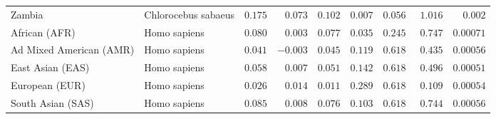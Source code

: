 \begin{center}
\begin{adjustbox}{width = 1\textwidth}
\begin{tabular}{|l|l|r|r|r|r|r|r|r|}
            Zambia        & Chlorocebus sabaeus        & $ 0.175$ & $ 0.073$ & $ 0.102$ & $ 0.007$ & $ 0.056~~$ & $ 1.016$ & $ 0.002$ \\
            African (AFR)               & Homo sapiens        & $ 0.080$ & $ 0.003$ & $ 0.077$ & $ 0.035$ & $ 0.245~~$        & $ 0.747$ & $0.00071$ \\
            Ad Mixed American (AMR)                 & Homo sapiens        & $ 0.041$ & $-0.003$ & $ 0.045$ & $ 0.119$ & $ 0.618~~$        & $ 0.435$ & $0.00056$ \\
            East Asian (EAS)              & Homo sapiens        & $ 0.058$ & $ 0.007$ & $ 0.051$ & $ 0.142$ & $ 0.618~~$        & $ 0.496$ & $0.00051$ \\
            European (EUR)              & Homo sapiens        & $ 0.026$ & $ 0.014$ & $ 0.011$ & $ 0.289$ & $ 0.618~~$        & $ 0.109$ & $0.00054$ \\
            South Asian (SAS)              & Homo sapiens        & $ 0.085$ & $ 0.008$ & $ 0.076$ & $ 0.103$ & $ 0.618~~$        & $ 0.744$ & $0.00056$ \\
            \bottomrule
        \end{tabular}
    \end{adjustbox}
    \newpage
\end{center}


